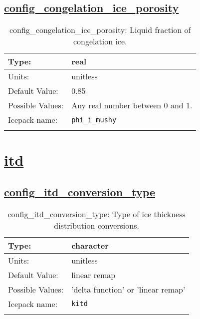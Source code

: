 \subsection[config\_congelation\_ice\_porosity]{\hyperref[sec:nm_tab_thermodynamics]{config\_congelation\_ice\_porosity}}
\label{subsec:nm_sec_config_congelation_ice_porosity}
\begin{center}
\begin{longtable}{| p{2.0in} || p{4.0in} |}
    \hline
    Type: & real \\
    \hline
    Units: & \si{unitless} \\
    \hline
    Default Value: & 0.85 \\
    \hline
    Possible Values: & Any real number between 0 and 1. \\
    \hline
    Icepack name: & \verb+phi_i_mushy+ \\
    \hline
    \caption{config\_congelation\_ice\_porosity: Liquid fraction of congelation ice.}
\end{longtable}
\end{center}
\section[itd]{\hyperref[sec:nm_tab_itd]{itd}}
\label{sec:nm_sec_itd}
\subsection[config\_itd\_conversion\_type]{\hyperref[sec:nm_tab_itd]{config\_itd\_conversion\_type}}
\label{subsec:nm_sec_config_itd_conversion_type}
\begin{center}
\begin{longtable}{| p{2.0in} || p{4.0in} |}
    \hline
    Type: & character \\
    \hline
    Units: & \si{unitless} \\
    \hline
    Default Value: & linear remap \\
    \hline
    Possible Values: & 'delta function' or 'linear remap' \\
    \hline
    Icepack name: & \verb+kitd+ \\
    \hline
    \caption{config\_itd\_conversion\_type: Type of ice thickness distribution conversions.}
\end{longtable}
\end{center}
